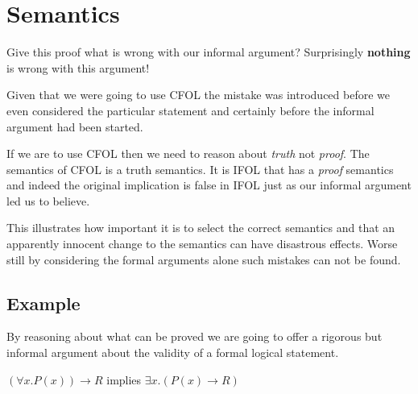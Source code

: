  
 
 
 
 
 





\section{Semantics}













Give this proof what is wrong with our informal argument?
Surprisingly    {\bf nothing} is wrong with this argument! 

Given that we were going to use CFOL the mistake was introduced   before we even considered the particular statement and certainly before the informal argument had been started. 

If we are to use CFOL then  we need to reason about \emph{truth} not \emph{proof}.  The semantics of CFOL is a truth semantics. It is IFOL that has a \emph{proof} semantics and indeed the original implication is false in IFOL just as our informal argument led us to believe.

This illustrates how important it is to select the correct semantics  and that an apparently innocent change to the semantics can have disastrous effects. Worse still by considering the formal arguments alone such mistakes can not be found. 




\subsection{Example}\label{sec:ex}

By reasoning about what can be proved we are going to offer a rigorous but informal argument  about the validity of a formal logical statement.

$(\forall x. P(x))  \rightarrow R$ implies $\exists x.  (P(x)\rightarrow R)$  \hspace{\fill}{\bf FS}


